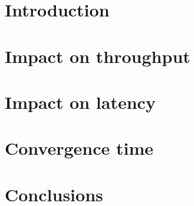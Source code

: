 \documentclass{article}
\begin{document}
\thispagestyle{empty}
\tableofcontents

\clearpage
\setcounter{page}{1}

\section{Introduction} \label{sec:Intro}
\vspace{-3mm}\HRule

    \begin{multicols}{2}
    
    \end{multicols}

\section{Impact on throughput} \label{sec:ImpactThroughput}
\vspace{-3mm}\HRule

    \begin{multicols}{2}
    
    \end{multicols}

\section{Impact on latency} \label{sec:ImpactLatency}
\vspace{-3mm}\HRule

    \begin{multicols}{2}
    
    \end{multicols}

\section{Convergence time} \label{sec:Convergence}
\vspace{-3mm}\HRule

    \begin{multicols}{2}
    
    \end{multicols}

\clearpage
\section{Conclusions} \label{sec:Conclusions}
\vspace{-3mm}\HRule

%    


\end{document}
